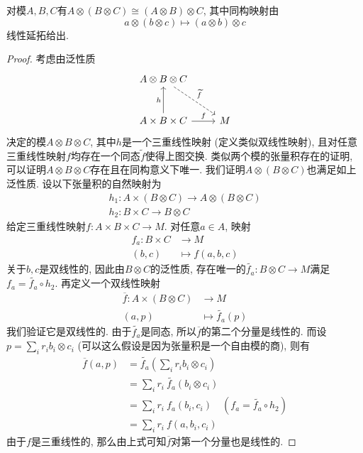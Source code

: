\begin{prop}[结合律]
    对模$A,B,C$有$A\otimes(B\otimes C)\cong(A\otimes B)\otimes C$, 其中同构映射由
    \[a\otimes(b\otimes c)\mapsto (a\otimes b)\otimes c\]
    线性延拓给出.
\end{prop}
\begin{proof}
    考虑由泛性质
    \[\begin{tikzcd}[row sep=large]
        A\otimes B\otimes C \arrow[dr, dashed, "\widetilde{f}"] & \\
        A\times B\times C \arrow[u, "h"] \arrow[r, "f"] & M 
    \end{tikzcd}\]
    决定的模$A\otimes B\otimes C$, 其中$h$是一个三重线性映射 (定义类似双线性映射), 且对任意三重线性映射$f$均存在一个同态$\widetilde{f}$使得上图交换.
    类似两个模的张量积存在的证明, 可以证明$A\otimes B\otimes C$存在且在同构意义下唯一.
    我们证明$A\otimes(B\otimes C)$也满足如上泛性质.
    设以下张量积的自然映射为
    \begin{gather*}
        h_1:A\times(B\otimes C)\to A\otimes(B\otimes C)\\
        h_2:B\times C\to B\otimes C
    \end{gather*}
    给定三重线性映射$f:A\times B\times C\to M$.
    对任意$a\in A$, 映射
    \begin{align*}
        f_a:B\times C&\to M\\
        (b,c)&\mapsto f(a,b,c)
    \end{align*}
    关于$b,c$是双线性的, 因此由$B\otimes C$的泛性质, 存在唯一的$\widetilde{f_a}:B\otimes C\to M$满足$f_a=\widetilde{f_a}\circ h_2$.
    再定义一个双线性映射
    \begin{align*}
        \overline{f}:A\times(B\otimes C)&\to M\\
        (a,p)&\mapsto \widetilde{f_a}(p)
    \end{align*}
    我们验证它是双线性的.
    由于$\widetilde{f_a}$是同态, 所以$\overline{f}$的第二个分量是线性的.
    而设$\displaystyle p=\sum_{i}r_ib_i\otimes c_i$ (可以这么假设是因为张量积是一个自由模的商), 则有
    \begin{align*}
        \overline{f}(a,p)&=\widetilde{f_a}\left(\sum_{i}r_ib_i\otimes c_i\right)\\
        &=\sum_ir_i\ \widetilde{f_a}(b_i\otimes c_i)\\
        &=\sum_ir_i\ f_a(b_i,c_i)\quad (f_a=\widetilde{f_a}\circ h_2)\\
        &=\sum_ir_i\ f(a,b_i,c_i)
    \end{align*}
    由于$f$是三重线性的, 那么由上式可知$\overline{f}$对第一个分量也是线性的.

\end{proof}
